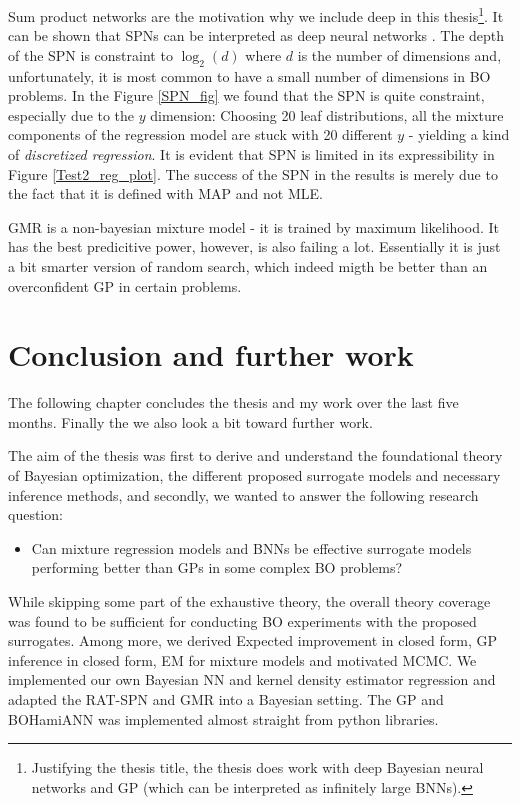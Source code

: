 Sum product networks are the motivation why we include deep in this thesis\footnote{Justifying the
thesis title, the thesis does work with deep Bayesian neural networks and GP (which can be
interpreted as infinitely large BNNs).}. It can be shown that SPNs can be interpreted as deep
neural networks \cite{SPN}. The depth of the SPN is constraint to $\log_2 (d)$ where $d$ is the
number of dimensions and, unfortunately, it is most common to have a small number of dimensions in
BO problems. In the Figure \ref{SPN_fig} we found that the SPN is quite constraint, especially due
to the $y$ dimension: Choosing 20 leaf distributions, all the mixture components of the regression
model are stuck with 20 different $y$ - yielding a kind of \textit{discretized regression}. It is
evident that SPN is limited in its expressibility in Figure \ref{Test2_reg_plot}. The success of the
SPN in the results is merely due to the fact that it is defined with MAP and not MLE. 

GMR is a non-bayesian mixture model - it is trained by maximum likelihood. It has
the best predicitive power, however, is also failing a lot. Essentially it is just a bit smarter
version of random search, which indeed migth be better than an overconfident GP in certain problems.

\chapter{Conclusion and further work}
The following chapter concludes the thesis and my work over the last five months. Finally the 
we also look a bit toward further work. 

The aim of the thesis was first to derive and understand the foundational theory of Bayesian
optimization, the different proposed surrogate models and necessary inference methods, and secondly,
we wanted to answer the following research question: 
\begin{itemize}
    \item Can mixture regression models and BNNs be effective surrogate models
    performing better than GPs in some complex BO problems? 
\end{itemize}

While skipping some part of the exhaustive theory, the overall theory coverage was found to be
sufficient for conducting BO experiments with the proposed surrogates. Among more, we derived
Expected improvement in closed form, GP inference in closed form, EM for mixture models and
motivated MCMC. We implemented our own Bayesian NN and kernel density estimator regression 
and adapted the RAT-SPN and GMR into a Bayesian setting. The GP and BOHamiANN was implemented
almost straight from python libraries. 

